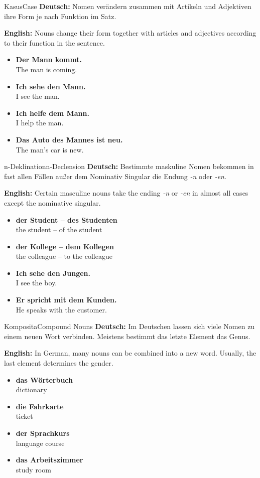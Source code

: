 \documentclass[a4paper,11pt]{article}
\newcommand{\GermanText}[1]{\textbf{Deutsch: }#1\par}
\newcommand{\EnglishText}[1]{{\color{SoftGray}\textbf{English: }#1\par}}
\newcommand{\ExampleItem}[2]{\item \textbf{#1}\\{\color{SoftGray}#2}}
\begin{document}
\begin{grammarentry}{Kasus}{Case}
    \GermanText{Nomen verändern zusammen mit Artikeln und Adjektiven ihre Form je nach Funktion im Satz.}
    \EnglishText{Nouns change their form together with articles and adjectives according to their function in the sentence.}
    \begin{exbox}
        \begin{itemize}
            \ExampleItem{Der Mann kommt.}{The man is coming.}
            \ExampleItem{Ich sehe den Mann.}{I see the man.}
            \ExampleItem{Ich helfe dem Mann.}{I help the man.}
            \ExampleItem{Das Auto des Mannes ist neu.}{The man's car is new.}
        \end{itemize}
    \end{exbox}
\end{grammarentry}

\begin{grammarentry}{n-Deklination}{n-Declension}
    \GermanText{Bestimmte maskuline Nomen bekommen in fast allen Fällen außer dem Nominativ Singular die Endung \textit{-n} oder \textit{-en}.}
    \EnglishText{Certain masculine nouns take the ending \textit{-n} or \textit{-en} in almost all cases except the nominative singular.}
    \begin{exbox}
        \begin{itemize}
            \ExampleItem{der Student -- des Studenten}{the student -- of the student}
            \ExampleItem{der Kollege -- dem Kollegen}{the colleague -- to the colleague}
            \ExampleItem{Ich sehe den Jungen.}{I see the boy.}
            \ExampleItem{Er spricht mit dem Kunden.}{He speaks with the customer.}
        \end{itemize}
    \end{exbox}
\end{grammarentry}

\begin{grammarentry}{Komposita}{Compound Nouns}
    \GermanText{Im Deutschen lassen sich viele Nomen zu einem neuen Wort verbinden. Meistens bestimmt das letzte Element das Genus.}
    \EnglishText{In German, many nouns can be combined into a new word. Usually, the last element determines the gender.}
    \begin{exbox}
        \begin{itemize}
            \ExampleItem{das Wörterbuch}{dictionary}
            \ExampleItem{die Fahrkarte}{ticket}
            \ExampleItem{der Sprachkurs}{language course}
            \ExampleItem{das Arbeitszimmer}{study room}
        \end{itemize}
    \end{exbox}
\end{grammarentry}
\end{document}
